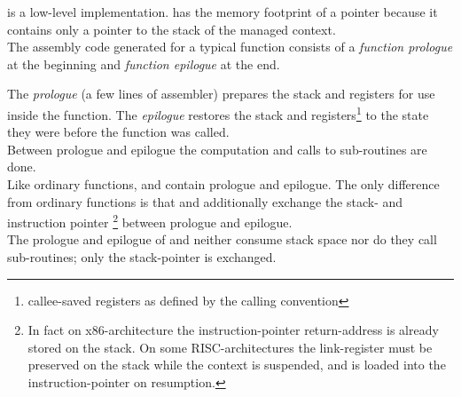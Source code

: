 
\cc is a low-level implementation. \cont has the memory footprint of a pointer
because it contains only a pointer to the stack of the managed context.\\
\newline
The assembly code generated for a typical function consists of
a \emph{function prologue} at the beginning and \emph{function epilogue} at
the end.

The \emph{prologue} (a few lines of assembler) prepares the stack and
registers for use inside the function. The \emph{epilogue} restores the stack
and registers\footnote{callee-saved registers as defined by the calling
convention} to the state they were before the function was called.\\
Between prologue and epilogue the computation and calls to sub-routines are
done.\\
\newline
Like ordinary functions, \resume and \resumewith contain prologue and
epilogue. The only difference from ordinary functions is that \resume and
\resumewith additionally exchange the stack- and instruction pointer
\footnote{In fact on x86-architecture the instruction-pointer return-address
is already stored on the stack. On some RISC-architectures the link-register
must be preserved on the stack while the context is suspended, and is loaded
into the instruction-pointer on resumption.} between prologue and epilogue.\\
The prologue and epilogue of \resume and \resumewith neither consume stack space
nor do they call sub-routines; only the stack-pointer is exchanged.
